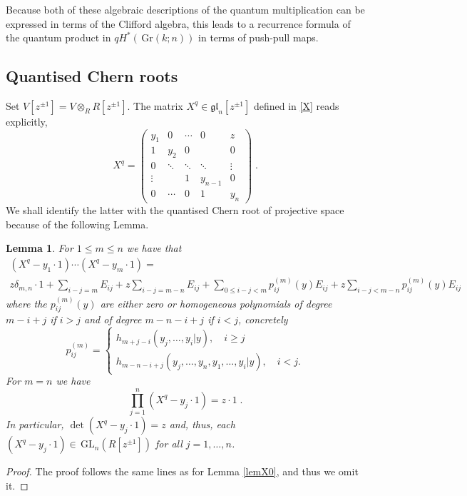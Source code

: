 \documentclass[12pt]{amsart}
\newcommand{\GL}{\,\mathrm{GL}}
\newcommand{\Gr}{\,\mathrm{Gr}}
\newcommand{\ring}{R}
\newtheorem{lemma}[prop]{Lemma}
\numberwithin{equation}{section}
\numberwithin{figure}{section}
\newcommand{\gl}{\mathfrak{gl}}
\begin{document}
Because both of these algebraic descriptions of the quantum multiplication can be expressed in terms of the Clifford algebra, this leads to a recurrence formula of the quantum product in $qH^*(\Gr(k;n))$ in terms of push-pull maps.

\subsection{Quantised Chern roots}
Set $V[z^{\pm 1}]=V\otimes_\ring\ring[z^{\pm 1}]$. The matrix $X^q\in\gl_n[z^{\pm 1}]$ defined in \eqref{X} reads explicitly,
\begin{equation}\label{Xmatrix}
    X^q=\begin{pmatrix}
    y_1 & 0 &\cdots &0 & z\\
    1& y_{2} &0 && 0\\
    0 &\ddots& \ddots &\ddots &\vdots\\
    \vdots &&1& y_{n-1}&0\\
    0& \cdots&0& 1 & y_n
    \end{pmatrix}\;.
\end{equation}
We shall identify the latter with the quantised Chern root of projective space because of the following Lemma.
\begin{lemma} \label{lem:BAE}
For $1\le m \leq n$ we have that
    \begin{multline*}
        (X^q-y_1\cdot 1)\cdots(X^q-y_m\cdot1)=\\
        z \delta_{m,n}\cdot 1 + \sum_{i-j=m}E_{ij}+z\sum_{i-j=m-n}E_{ij}+
    \sum_{0\le i-j<m}p^{(m)}_{ij}(y)E_{ij}+z\sum_{i-j<m-n}p^{(m)}_{ij}(y)E_{ij}
    \end{multline*}
    where the $p^{(m)}_{ij}(y)$ are either zero or homogeneous polynomials of degree $m-i+j$ if $i>j$ and of degree $m-n-i+j$ if $i<j$, concretely
    \[
        p_{ij}^{(m)} = \left\{
        \begin{array}{ll}
            h_{m + j - i}(y_j,\ldots,y_i|y), \quad i \geq j \\
            h_{m - n - i + j}(y_j, \ldots, y_n, y_1, \ldots, y_i|y), \quad i < j. 
        \end{array}
        \right.
    \]
    For $m=n$ we have
    \begin{equation}\label{GrassBAE}
    \prod_{j=1}^n(X^q-y_j\cdot1)=z\cdot 1\;.
\end{equation}
In particular, $\det(X^q-y_j\cdot1)=z$ and, thus, each $(X^q-y_j\cdot 1)\in\GL_n(\ring[z^{\pm1}])$ for all $j=1,\ldots,n$.
\end{lemma}
\begin{proof}
    The proof follows the same lines as for Lemma \ref{lemX0}, and thus we omit it.  
\end{proof}
\end{document}
